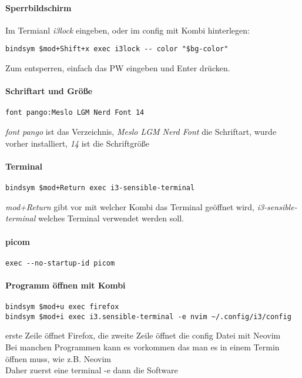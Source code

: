 \documentclass[10pt,a4paper,twoside]{book}
\begin{document}
\paragraph{Sperrbildschirm}
Im Termianl \textit{i3lock} eingeben, oder im config mit Kombi hinterlegen:
\begin{verbatim}
bindsym $mod+Shift+x exec i3lock -- color "$bg-color"
\end{verbatim}
Zum entsperren, einfach das PW eingeben und Enter drücken.
\paragraph{Schriftart und Größe}
\begin{verbatim}
font pango:Meslo LGM Nerd Font 14
\end{verbatim}
\textit{font pango\:} ist das Verzeichnis, \textit{Meslo LGM Nerd Font} die Schriftart, wurde vorher installiert, \textit{14} ist die Schriftgröße\\
\paragraph{Terminal}
\begin{verbatim}
bindsym $mod+Return exec i3-sensible-terminal
\end{verbatim}
\textit{mod+Return} gibt vor mit welcher Kombi das Terminal geöffnet wird, \textit{i3-sensible-terminal} welches Terminal verwendet werden soll.\\
\paragraph{picom}
\begin{verbatim}
exec --no-startup-id picom
\end{verbatim}
\paragraph{Programm öffnen mit Kombi}
\begin{verbatim}
bindsym $mod+u exec firefox
bindsym $mod+i exec i3.sensible-terminal -e nvim ~/.config/i3/config
\end{verbatim}
erste Zeile öffnet Firefox, die zweite Zeile öffnet die config Datei mit Neovim\\
Bei manchen Programmen kann es vorkommen das man es in einem Termin öffnen muss, wie z.B. Neovim\\
Daher zuerst eine terminal -e dann die Software\\
\end{document}
